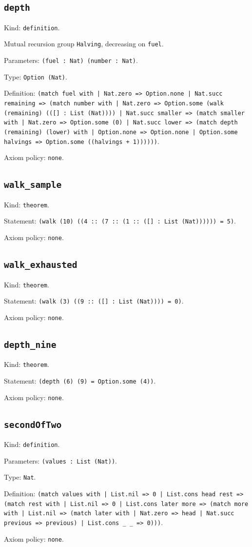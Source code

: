 \documentclass[11pt]{article}
\begin{document}
\subsection*{\texttt{depth}}
\noindent Kind: \texttt{definition}.\par
\noindent Mutual recursion group \texttt{Halving}, decreasing on \texttt{fuel}.\par
\noindent Parameters: \texttt{(fuel : Nat) (number : Nat)}.\par
\noindent Type: \texttt{Option (Nat)}.\par
\noindent Definition: \texttt{(match fuel with | Nat.zero => Option.none | Nat.succ remaining => (match number with | Nat.zero => Option.some (walk (remaining) (([] : List (Nat)))) | Nat.succ smaller => (match smaller with | Nat.zero => Option.some (0) | Nat.succ lower => (match depth (remaining) (lower) with | Option.none => Option.none | Option.some halvings => Option.some ((halvings + 1))))))}.\par
\noindent Axiom policy: \texttt{none}.\par
\subsection*{\texttt{walk\_sample}}
\noindent Kind: \texttt{theorem}.\par
\noindent Statement: \texttt{(walk (10) ((4 :: (7 :: (1 :: ([] : List (Nat)))))) = 5)}.\par
\noindent Axiom policy: \texttt{none}.\par
\subsection*{\texttt{walk\_exhausted}}
\noindent Kind: \texttt{theorem}.\par
\noindent Statement: \texttt{(walk (3) ((9 :: ([] : List (Nat)))) = 0)}.\par
\noindent Axiom policy: \texttt{none}.\par
\subsection*{\texttt{depth\_nine}}
\noindent Kind: \texttt{theorem}.\par
\noindent Statement: \texttt{(depth (6) (9) = Option.some (4))}.\par
\noindent Axiom policy: \texttt{none}.\par
\subsection*{\texttt{secondOfTwo}}
\noindent Kind: \texttt{definition}.\par
\noindent Parameters: \texttt{(values : List (Nat))}.\par
\noindent Type: \texttt{Nat}.\par
\noindent Definition: \texttt{(match values with | List.nil => 0 | List.cons head rest => (match rest with | List.nil => 0 | List.cons later more => (match more with | List.nil => (match later with | Nat.zero => head | Nat.succ previous => previous) | List.cons \_ \_ => 0)))}.\par
\noindent Axiom policy: \texttt{none}.\par
\end{document}
